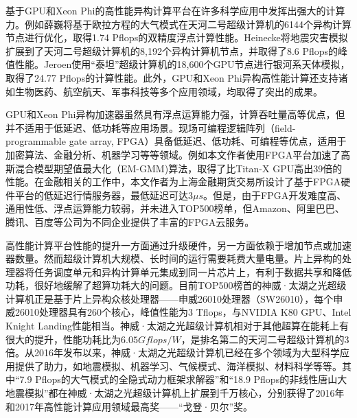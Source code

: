 基于GPU和Xeon Phi的高性能异构计算平台在许多科学应用中发挥出强大的计算力。例如薛巍将基于欧拉方程的大气模式在天河二号超级计算机的6144个异构计算节点进行优化，取得1.74 Pflops的双精度浮点计算性能\cite{xue2015ultra}。Heinecke将地震灾害模拟扩展到了天河二号超级计算机的8,192个异构计算机节点，并取得了8.6 Pflops的峰值性能\cite{heinecke2014petascale}。Jeroen使用“泰坦”超级计算机的18,600个GPU节点进行银河系天体模拟，取得了24.77 Pflops的计算性能\cite{bedorf201424}。此外，GPU和Xeon Phi异构高性能计算还支持诸如生物医药\cite{tumeo2010accelerating,chen2008gpu}、航空航天\cite{habib2012universe,kampolis2010cfd}、军事科技\cite{ariga2014fast,fronckowiak2009using}等多个应用领域，均取得了突出的成果。

GPU和Xeon Phi异构加速器虽然具有浮点运算能力强，计算吞吐量高等优点，但并不适用于低延迟、低功耗等应用场景。现场可编程逻辑阵列（field-programmable gate array, FPGA）具备低延迟、低功耗、可编程等优点，适用于加密算法\cite{elbirt2000fpga,elbirt2000fpga,hauser1997garp}、金融分析\cite{zhang2005reconfigurable,jin2013optimising,tse2010reconfigurable,becker2015maxeler}、机器学习\cite{irick2008hardware,zhang2015optimizing,wang2017dlau}等等领域。例如本文作者使用FPGA平台加速了高斯混合模型期望值最大化（EM-GMM)算法，取得了比Titan-X GPU高出39倍的性能\cite{he2017fully}。在金融相关的工作中，本文作者为上海金融期货交易所设计了基于FPGA硬件平台的低延迟行情服务器\cite{fu2017nanosecond,he2017exploring,fu2017accelerating}，最低延迟可达$3\mu s$。但是，由于FPGA开发难度高、通用性低、浮点运算能力较弱，并未进入TOP500榜单，但Amazon、阿里巴巴、腾讯、百度等公司为不同企业提供了丰富的FPGA云服务\cite{tarafdar2018designing}。

高性能计算平台性能的提升一方面通过升级硬件，另一方面依赖于增加节点或加速器数量。然而超级计算机大规模、长时间的运行需要耗费大量电量\cite{reed2015exascale}。片上异构的处理器将任务调度单元和异构计算单元集成到同一片芯片上，有利于数据共享和降低功耗，很好地缓解了超算功耗大的问题。目前TOP500榜首的神威·太湖之光超级计算机正是基于片上异构众核处理器\cite{fu2016sunway}——申威26010处理器（SW26010），每个申威26010处理器具有260个核心，峰值性能为3 Tflops，与NVIDIA K80 GPU、Intel Knight Landing性能相当\cite{einkemmer2017evaluation,sodani2016knights}。神威·太湖之光超级计算机相对于其他超算在能耗上有很大的提升，性能功耗比为$6.05Gflops/W$，是排名第二的天河二号超级计算机的3倍。从2016年发布以来，神威·太湖之光超级计算机已经在多个领域为大型科学应用提供了助力，如地震模拟\cite{fu201718}、机器学习\cite{fang2017swdnn}、气候模式\cite{yang201610m,fu2016refactoring}、海洋模拟\cite{qiao2016highly}、材料科学\cite{zhang2016extreme}等等。其中“7.9 Pflops的大气模式的全隐式动力框架求解器”和“18.9 Pflops的非线性唐山大地震模拟”都在神威·太湖之光超级计算机上扩展到千万核心，分别获得了2016年和2017年高性能计算应用领域最高奖——“戈登·贝尔”奖。


